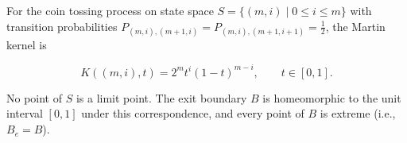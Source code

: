For the coin tossing process on state space $S = \{(m,i) \mid 0 \leq i \leq m\}$ with transition probabilities $P_{(m,i),(m+1,i)} = P_{(m,i),(m+1,i+1)} = \frac{1}{2}$, the Martin kernel is

$$K((m,i), t) = 2^m t^i (1 - t)^{m-i}, \qquad t \in [0,1].$$

No point of $S$ is a limit point. The exit boundary $B$ is homeomorphic to the unit interval $[0,1]$ under this correspondence, and every point of $B$ is extreme (i.e., $B_e = B$).

